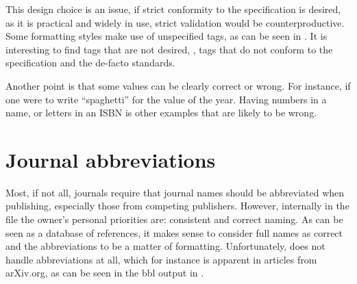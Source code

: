This design choice is an issue, if strict conformity to the
specification is desired, as it is practical and widely in use, strict
validation would be counterproductive.  Some formatting styles make
use of unspecified tags, as can be seen in
. It is interesting to find tags that are
not desired, \ie, tags that do not conform to the specification and
the de-facto standards.

Another point is that some values can be clearly correct or wrong.
For instance, if one were to write ``spaghetti'' for the value of the
year.  Having numbers in a name, or letters in an ISBN is other
examples that are likely to be wrong.


\section{Journal abbreviations}
\label{sec:problems_abbreviations}

Most, if not all, journals require that journal names should be
abbreviated when publishing, especially those from competing
publishers.  However, internally in the {\bibtex} file the owner's
personal priorities are: consistent and correct naming.  As {\bibtex}
can be seen as a database of references, it makes sense to consider
full names as correct and the abbreviations to be a matter of
formatting.  Unfortunately, {\bibtex} does not handle abbreviations at
all, which for instance is apparent in articles from arXiv.org, as can
be seen in the bbl output in .

